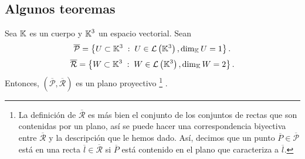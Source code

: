 \subsection{Algunos teoremas}
\begin{theorem}
Sea $\displaystyle \mathbb{K} $ es un cuerpo y $\displaystyle \mathbb{K}^{3} $ un espacio vectorial. Sean 
\[\overline{\mathcal{P}} = \left\{ U \subset \mathbb{K}^{3} \; : \; U \in \mathcal{L}\left(\mathbb{K}^{3}\right), \dim _{\mathbb{K}}U = 1\right\}  .\]
\[\overline{\mathcal{R}} = \left\{ W \subset \mathbb{K}^{3} \; : \; W \in \mathcal{L}\left(\mathbb{K}^{3}\right), \dim _{\mathbb{K}} W = 2\right\}  .\]
Entonces, $\displaystyle \left(\overline{\mathcal{P}}, \overline{\mathcal{R}}\right) $ es un plano proyectivo 
\footnote{La definición de $\displaystyle \overline{\mathcal{R}} $ es más bien el conjunto de los conjuntos de rectas que son contenidas por un plano, así se puede hacer una correspondencia biyectiva entre $\displaystyle \overline{\mathcal{R}} $ y la descripción que le hemos dado. Así, decimos que un punto $\displaystyle \overline{P} \in \overline{\mathcal{P}} $ está en una recta $\displaystyle \overline{l} \in \overline{\mathcal{R}} $ si $\displaystyle \overline{P} $ está contenido en el plano que caracteriza a $\displaystyle \overline{l} $.} .
\end{theorem}

